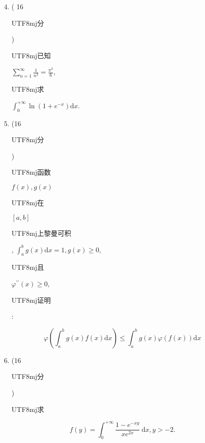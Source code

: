 \documentclass[10pt]{article}
\begin{document}
\begin{enumerate}
  \setcounter{enumi}{3}
  \item ( 16 \begin{CJK}{UTF8}{mj}分\end{CJK}) \begin{CJK}{UTF8}{mj}已知\end{CJK} $\sum_{n=1}^{\infty} \frac{1}{n^{2}}=\frac{\pi^{2}}{6}$, \begin{CJK}{UTF8}{mj}求\end{CJK} $\int_{0}^{+\infty} \ln \left(1+e^{-x}\right) \mathrm{d} x$.

  \item (16 \begin{CJK}{UTF8}{mj}分\end{CJK}) \begin{CJK}{UTF8}{mj}函数\end{CJK} $f(x), g(x)$ \begin{CJK}{UTF8}{mj}在\end{CJK} $[a, b]$ \begin{CJK}{UTF8}{mj}上黎曼可积\end{CJK}, $\int_{a}^{b} g(x) \mathrm{d} x=1, g(x) \geqslant 0$, \begin{CJK}{UTF8}{mj}且\end{CJK} $\varphi^{\prime \prime}(x) \geqslant 0$, \begin{CJK}{UTF8}{mj}证明\end{CJK}:

\end{enumerate}
$$
\varphi\left(\int_{a}^{b} g(x) f(x) \mathrm{d} x\right) \leqslant \int_{a}^{b} g(x) \varphi(f(x)) \mathrm{d} x
$$

\begin{enumerate}
  \setcounter{enumi}{5}
  \item (16 \begin{CJK}{UTF8}{mj}分\end{CJK}) \begin{CJK}{UTF8}{mj}求\end{CJK}
\end{enumerate}
$$
f(y)=\int_{0}^{+\infty} \frac{1-e^{-x y}}{x e^{2 x}} \mathrm{~d} x, y>-2 .
$$
\end{document}
